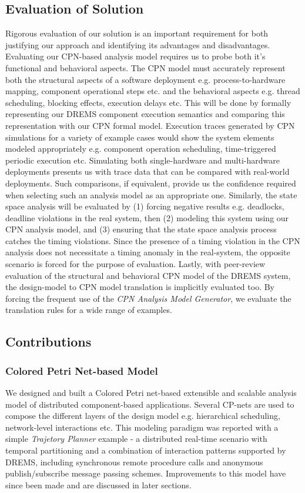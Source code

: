\subsection{Evaluation of Solution}
Rigorous evaluation of our solution is an important requirement for both justifying our approach and identifying its advantages and disadvantages. Evaluating our CPN-based analysis model requires us to probe both it's functional and behavioral aspects. The CPN model must accurately represent both the structural aspects of a software deployment e.g. process-to-hardware mapping, component operational steps etc. and the behavioral aspects e.g. thread scheduling, blocking effects, execution delays etc. This will be done by formally representing our DREMS component execution semantics and comparing this representation with our CPN formal model. Execution traces generated by CPN simulations for a variety of example cases would show the system elements modeled appropriately e.g. component operation scheduling, time-triggered periodic execution etc. Simulating both single-hardware and multi-hardware deployments presents us with trace data that can be compared with real-world deployments. Such comparisons, if equivalent, provide us the confidence required when selecting such an analysis model as an appropriate one. Similarly, the state space analysis will be evaluated by (1) forcing negative results e.g. deadlocks, deadline violations in the real system, then (2) modeling this system using our CPN analysis model, and (3) ensuring that the state space analysis process catches the timing violations. Since the presence of a timing violation in the CPN analysis does not necessitate a timing anomaly in the real-system, the opposite scenario is forced for the purpose of evaluation. Lastly, with peer-review evaluation of the structural and behavioral CPN model of the DREMS system, the design-model to CPN model translation is implicitly evaluated too. By forcing the frequent use of the \emph{CPN Analysis Model Generator}, we evaluate the translation rules for a wide range of examples. 

\subsection{Contributions}

\subsubsection{Colored Petri Net-based Model}
We designed and built a Colored Petri net-based extensible and scalable analysis model of distributed component-based applications. Several CP-nets are used to compose the different layers of the design model e.g. hierarchical scheduling, network-level interactions etc. This modeling paradigm was reported \cite{kumar2014colored} with a simple \emph{Trajetory Planner} example - a distributed real-time scenario with temporal partitioning and a combination of interaction patterns supported by DREMS, including synchronous remote procedure calls and anonymous publish/subscribe message passing schemes. Improvements to this model have since been made and are discussed in later sections. 


